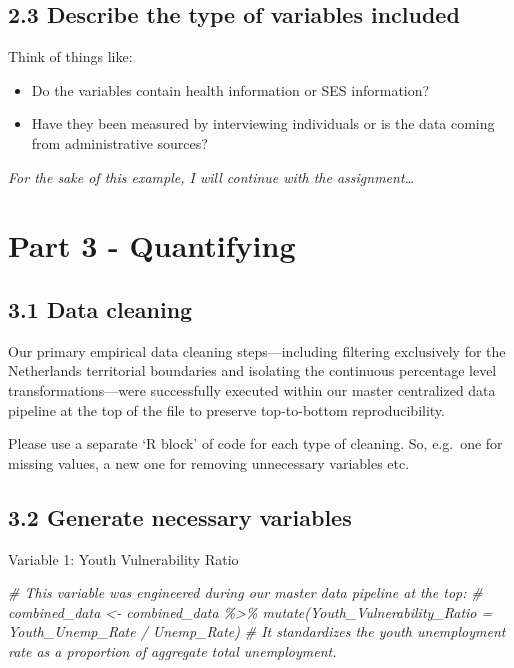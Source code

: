 \documentclass[
]{article}
\newenvironment{Shaded}{\begin{snugshade}}{\end{snugshade}}
\newcommand{\CommentTok}[1]{\textcolor[rgb]{0.56,0.35,0.01}{\textit{#1}}}
\begin{document}
\subsection{2.3 Describe the type of variables
included}\label{describe-the-type-of-variables-included}

Think of things like:

\begin{itemize}
\item
  Do the variables contain health information or SES information?
\item
  Have they been measured by interviewing individuals or is the data
  coming from administrative sources?
\end{itemize}

\emph{For the sake of this example, I will continue with the
assignment\ldots{}}

\section{Part 3 - Quantifying}\label{part-3---quantifying}

\subsection{3.1 Data cleaning}\label{data-cleaning}

Our primary empirical data cleaning steps---including filtering
exclusively for the Netherlands territorial boundaries and isolating the
continuous percentage level transformations---were successfully executed
within our master centralized data pipeline at the top of the file to
preserve top-to-bottom reproducibility.

Please use a separate `R block' of code for each type of cleaning. So,
e.g.~one for missing values, a new one for removing unnecessary
variables etc.

\subsection{3.2 Generate necessary
variables}\label{generate-necessary-variables}

Variable 1: Youth Vulnerability Ratio

\begin{Shaded}
\begin{Highlighting}[]
\CommentTok{\# This variable was engineered during our master data pipeline at the top:}
\CommentTok{\# combined\_data \textless{}{-} combined\_data \%\textgreater{}\% mutate(Youth\_Vulnerability\_Ratio = Youth\_Unemp\_Rate / Unemp\_Rate)}
\CommentTok{\# It standardizes the youth unemployment rate as a proportion of aggregate total unemployment.}
\end{Highlighting}
\end{Shaded}
\end{document}
